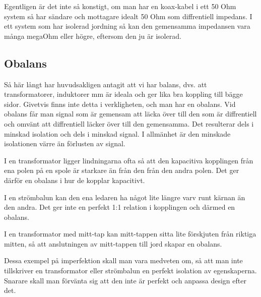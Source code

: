 Egentligen är det inte så konstigt, om man har en koax-kabel i ett 50 Ohm
system så har sändare och mottagare idealt 50 Ohm som diffrentiell impedans.
I ett system som har isolerad jordning så kan den gemensamma impedansen vara
många megaOhm eller högre, eftersom den ju är isolerad.

\subsection{Obalans}

Så här långt har huvudsakligen antagit att vi har balans, dvs. att
transformatorer, induktorer mm är ideala och ger lika bra koppling till bägge
sidor. Givetvis finns inte detta i verkligheten, och man har en obalans.
Vid obalans får man signal som är gemensam att läcka över till den som är
diffrentiell och omvänt att diffrentiell läcker över till den gemensamma.
Det resulterar dels i minskad isolation och dels i minskad signal.
I allmänhet är den minskade isolationen värre än förlusten av signal.

I en transformator ligger lindningarna ofta så att den kapacitiva kopplingen
från ena polen på en spole är starkare än från den från den andra polen.
Det ger därför en obalans i hur de kopplar kapacitivt.

I en strömbalun kan den ena ledaren ha något lite längre varv runt kärnan än
den andra. Det ger inte en perfekt 1:1 relation i kopplingen och därmed en
obalans.

I en transformator med mitt-tap kan mitt-tappen sitta lite förskjuten från
riktiga mitten, så att anslutningen av mitt-tappen till jord skapar en
obalans.

Dessa exempel på imperfektion skall man vara medveten om, så att man inte
tillskriver en transformator eller strömbalun en perfekt isolation av
egenskaperna. Snarare skall man förvänta sig att den inte är perfekt och
anpassa design efter det.
